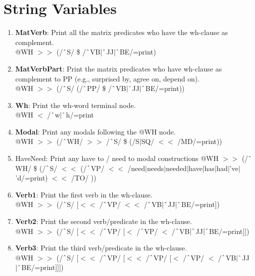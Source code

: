 \section{String Variables}
\begin{enumerate}
    \item \textbf{MatVerb}: Print all the matrix predicates who have the wh-clause as complement.\\
    @WH $>\!\!>$ (/$\string^$S/ \$ /$\string^$VB$|\string^$JJ$|\string^$BE/=print)

    \item \textbf{MatVerbPart}: Print the matrix predicates who have wh-clause as complement to PP (e.g., \textsf{surprised by}, \textsf{agree on}, \textsf{depend on}).\\
    @WH $>\!\!>$ (/$\string^$S/ (/$\string^$PP/ \$ /$\string^$VB$|\string^$JJ$|\string^$BE/=print))

    \item \textbf{Wh}: Print the wh-word terminal node.\\
    @WH $<$ /$\string^$w$|\string^$h/=print

    \item \textbf{Modal}: Print any modals following the @WH node.\\
    @WH $>\!\!>$ (/$\string^$WH/ $>\!\!>$ /$\string^$S/ \$ (/S$|$SQ/ $<\!\!<$ /MD/=print))
    
    \item \textsf{HaveNeed}: Print any \textsf{have to} / \textsf{need to} modal constructions
    @WH $>\!\!>$ (/$\string^$WH/ \$ (/$\string^$S/ $<\!\!<$ (/$\string^$VP/ $<\!\!<$ /need$|$needs$|$needed$|$have$|$has$|$had$|$'ve$|$'d/=print) $<\!\!<$ /TO/ ))

    \item \textbf{Verb1}: Print the first verb in the wh-clause. \\
    @WH $>\!\!>$ (/$\string^$S/ [$<\!\!<$ /$\string^$VP/ $<\!\!<$ /$\string^$VB$|\string^$JJ$|\string^$BE/=print])

    \item \textbf{Verb2}: Print the second verb/predicate in the wh-clause.\\
    @WH $>\!\!>$ (/$\string^$S/ [$<\!\!<$ /$\string^$VP/ [$<$ /$\string^$VP/ $<$ /$\string^$VB$|\string^$JJ$|\string^$BE/=print]])
    
    \item \textbf{Verb3}: Print the third verb/predicate in the wh-clause.\\
    @WH $>\!\!>$ (/$\string^$S/ [$<\!\!<$ /$\string^$VP/ [$<\!\!<$ /$\string^$VP/ [$<$ /$\string^$VP/ $<$ /$\string^$VB$|\string^$JJ$|\string^$BE/=print]]])
    

\end{enumerate}

